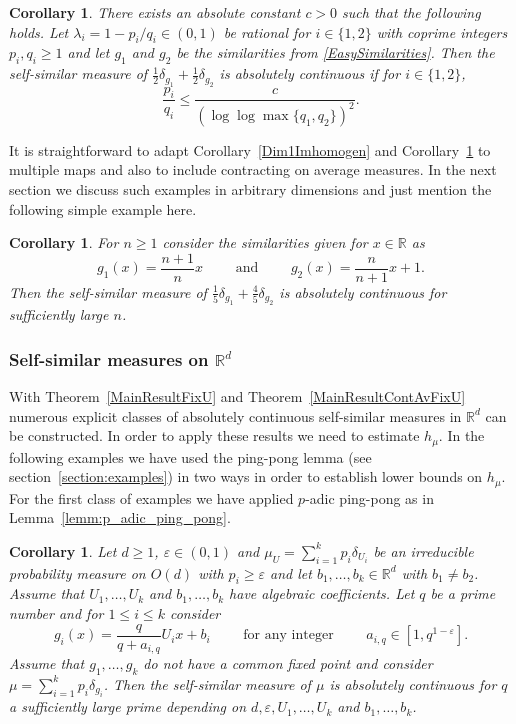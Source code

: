 \documentclass[10pt, english,oneside,reqno]{amsart}
\theoremstyle{plain}
\newtheorem{corollary}[theorem]{Corollary}
\theoremstyle{remark}
\numberwithin{equation}{section}
\numberwithin{figure}{section}
\newcommand{\eps}{\varepsilon}
\newcommand{\R}{\mathbb{R}}
\begin{document}
    \begin{corollary}\label{Dim1ImhomogenEasy}
        There exists an absolute constant $c > 0$ such that the following holds. Let $\lambda_i = 1 - p_i/q_i \in (0,1)$ be rational for $i \in \{1,2 \}$ with coprime integers $p_i, q_i \geq 1$ and let $g_1$ and $g_2$ be the similarities from \eqref{EasySimilarities}. Then the self-similar measure of $\frac{1}{2}\delta_{g_1} + \frac{1}{2}\delta_{g_2}$ is absolutely continuous if for $i \in \{ 1,2 \}$, $$\frac{p_i}{q_i}\leq \frac{c}{(\log \log \max\{q_1, q_2\})^2}.$$ 
    \end{corollary}



    It is straightforward to adapt Corollary~\ref{Dim1Imhomogen} and Corollary~\ref{Dim1ImhomogenEasy} to multiple maps and also to include contracting on average measures. In the next section we discuss such examples in arbitrary dimensions and just mention the following simple example here. 

    \begin{corollary}\label{Dim1ContAverageEasy}
        For $n\geq 1$ consider the similarities given for $x\in \R$ as $$g_1(x) = \frac{n + 1}{n} x \quad\quad \text{ and } \quad\quad g_2(x) = \frac{n}{n+ 1} x + 1.$$ Then the self-similar measure of $\frac{1}{5}\delta_{g_1} + \frac{4}{5}\delta_{g_2}$ is absolutely continuous for sufficiently large $n$. 
    \end{corollary}
    
    \subsubsection*{\normalfont\textbf{Self-similar measures on $\R^d$}}

    With Theorem~\ref{MainResultFixU} and Theorem~\ref{MainResultContAvFixU} numerous explicit classes of absolutely continuous self-similar measures in $\R^d$ can be constructed. In order to apply these results we need to estimate $h_{\mu}$. In the following examples we have used the ping-pong lemma (see section~\ref{section:examples}) in two ways in order to establish lower bounds on $h_{\mu}$. For the first class of examples we have applied $p$-adic ping-pong as in Lemma~\ref{lemm:p_adic_ping_pong}.
            
    \begin{corollary}\label{QuiteGeneralExample}
    Let $d \geq 1$, $\eps \in (0,1)$ and $\mu_U = \sum_{i = 1}^k p_i\delta_{U_i}$ be an irreducible probability measure on $O(d)$ with $p_i \geq \eps$ and let $b_1, \ldots , b_k \in \R^d$ with $b_1 \neq b_2$. Assume that $U_1, \ldots , U_k$ and $b_1, \ldots , b_k$ have algebraic coefficients. Let $q$ be a prime number and for $1 \leq i \leq k$ consider $$g_i(x) = \frac{q}{q+a_{i,q}}U_ix + b_i \quad \quad \text{ for any integer } \quad \quad a_{i,q} \in [1, q^{1-\eps}].$$ Assume that $g_1, \ldots , g_k$ do not have a common fixed point and consider $\mu = \sum_{i = 1}^k p_i\delta_{g_i}$. Then the self-similar measure of $\mu$ is absolutely continuous for $q$ a sufficiently large prime depending on $d,\eps,U_1, \ldots , U_k$ and $b_1, \ldots , b_k$. 
    \end{corollary}
\end{document}
